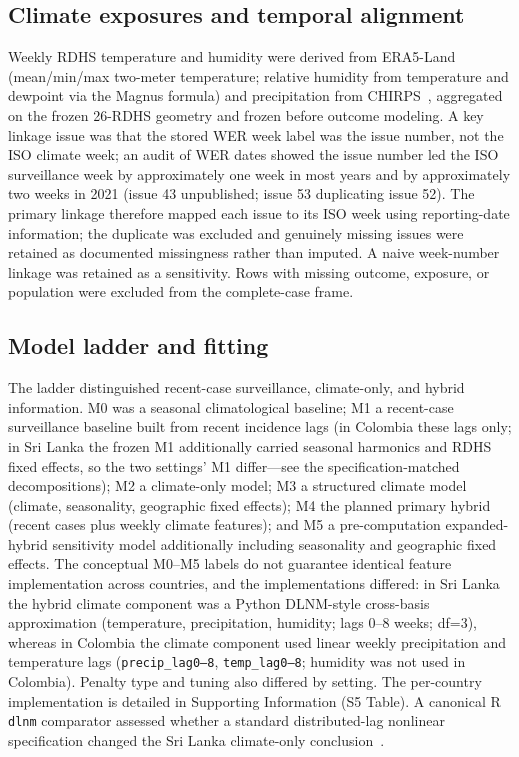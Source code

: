 \documentclass[11pt,a4paper]{article}
\begin{document}
\subsection{Climate exposures and temporal alignment}
Weekly RDHS temperature and humidity were derived from ERA5-Land~\cite{MunozSabater2021,ERA5LandCDS} (mean/min/max two-meter temperature; relative humidity from temperature and dewpoint via the Magnus formula) and precipitation from CHIRPS~\cite{Funk2015,CHIRPS}, aggregated on the frozen 26-RDHS geometry and frozen before outcome modeling. A key linkage issue was that the stored WER week label was the issue number, not the ISO climate week; an audit of WER dates showed the issue number led the ISO surveillance week by approximately one week in most years and by approximately two weeks in 2021 (issue 43 unpublished; issue 53 duplicating issue 52). The primary linkage therefore mapped each issue to its ISO week using reporting-date information; the duplicate was excluded and genuinely missing issues were retained as documented missingness rather than imputed. A naive week-number linkage was retained as a sensitivity. Rows with missing outcome, exposure, or population were excluded from the complete-case frame.

\subsection{Model ladder and fitting}
The ladder distinguished recent-case surveillance, climate-only, and hybrid information. M0 was a seasonal climatological baseline; M1 a recent-case surveillance baseline built from recent incidence lags (in Colombia these lags only; in Sri Lanka the frozen M1 additionally carried seasonal harmonics and RDHS fixed effects, so the two settings' M1 differ---see the specification-matched decompositions); M2 a climate-only model; M3 a structured climate model (climate, seasonality, geographic fixed effects); M4 the planned primary hybrid (recent cases plus weekly climate features); and M5 a pre-computation expanded-hybrid sensitivity model additionally including seasonality and geographic fixed effects. The conceptual M0--M5 labels do not guarantee identical feature implementation across countries, and the implementations differed: in Sri Lanka the hybrid climate component was a Python DLNM-style cross-basis approximation (temperature, precipitation, humidity; lags 0--8 weeks; df=3), whereas in Colombia the climate component used linear weekly precipitation and temperature lags (\texttt{precip\_lag0--8}, \texttt{temp\_lag0--8}; humidity was not used in Colombia). Penalty type and tuning also differed by setting. The per-country implementation is detailed in Supporting Information (S5 Table). A canonical R \texttt{dlnm} comparator assessed whether a standard distributed-lag nonlinear specification changed the Sri Lanka climate-only conclusion~\cite{Gasparrini2010,Gasparrini2011}.
\end{document}

